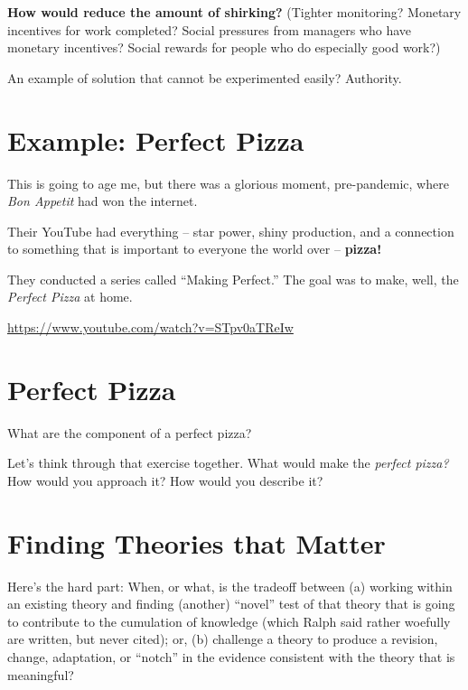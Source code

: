 \documentclass[
  letterpaper,
  DIV=11,
  numbers=noendperiod]{scrreprt}
\begin{document}
\textbf{How would reduce the amount of shirking?} (Tighter monitoring?
Monetary incentives for work completed? Social pressures from managers
who have monetary incentives? Social rewards for people who do
especially good work?)

An example of solution that cannot be experimented easily? Authority.

\section{Example: Perfect Pizza}\label{example-perfect-pizza}

This is going to age me, but there was a glorious moment, pre-pandemic,
where \emph{Bon Appetit} had won the internet.

Their YouTube had everything -- star power, shiny production, and a
connection to something that is important to everyone the world over --
\textbf{pizza!}

They conducted a series called ``Making Perfect.'' The goal was to make,
well, the \emph{Perfect Pizza} at home.

\url{https://www.youtube.com/watch?v=STpv0aTReIw}

\section{Perfect Pizza}\label{perfect-pizza}

What are the component of a perfect pizza?

Let's think through that exercise together. What would make the
\emph{perfect pizza?} How would you approach it? How would you describe
it?

\section{Finding Theories that
Matter}\label{finding-theories-that-matter}

Here's the hard part: When, or what, is the tradeoff between (a) working
within an existing theory and finding (another) ``novel'' test of that
theory that is going to contribute to the cumulation of knowledge (which
Ralph said rather woefully are written, but never cited); or, (b)
challenge a theory to produce a revision, change, adaptation, or
``notch'' in the evidence consistent with the theory that is meaningful?
\end{document}
